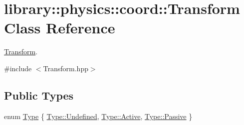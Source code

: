 \hypertarget{classlibrary_1_1physics_1_1coord_1_1_transform}{}\section{library\+:\+:physics\+:\+:coord\+:\+:Transform Class Reference}
\label{classlibrary_1_1physics_1_1coord_1_1_transform}


\hyperlink{classlibrary_1_1physics_1_1coord_1_1_transform}{Transform}.  




{\ttfamily \#include $<$Transform.\+hpp$>$}

\subsection*{Public Types}
\begin{DoxyCompactItemize}
\item 
enum \hyperlink{classlibrary_1_1physics_1_1coord_1_1_transform_a4f19d7d232ce1fda0dcee16e4157db2c}{Type} \{ \hyperlink{classlibrary_1_1physics_1_1coord_1_1_transform_a4f19d7d232ce1fda0dcee16e4157db2caec0fc0100c4fc1ce4eea230c3dc10360}{Type\+::\+Undefined}, 
\hyperlink{classlibrary_1_1physics_1_1coord_1_1_transform_a4f19d7d232ce1fda0dcee16e4157db2ca4d3d769b812b6faa6b76e1a8abaece2d}{Type\+::\+Active}, 
\hyperlink{classlibrary_1_1physics_1_1coord_1_1_transform_a4f19d7d232ce1fda0dcee16e4157db2caf80bc338b6146b566004a046f8137c85}{Type\+::\+Passive}
 \}
\end{DoxyCompactItemize}
